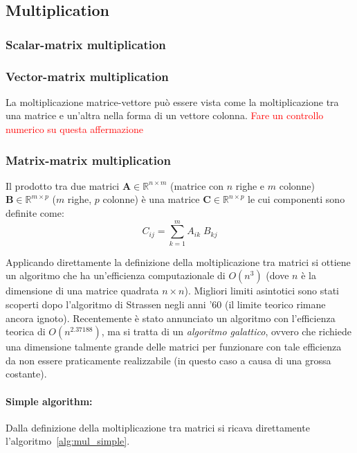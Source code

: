 \documentclass[10pt]{article}
\begin{document}
\subsection{Multiplication}

\subsubsection{Scalar-matrix multiplication}
\subsubsection{Vector-matrix multiplication}

La moltiplicazione matrice-vettore può essere vista come la moltiplicazione tra una matrice e un'altra nella forma di un vettore colonna.
\textcolor{red}{Fare un controllo numerico su questa affermazione}

\subsubsection{Matrix-matrix multiplication}

Il prodotto tra due matrici $\mathbf{A} \in \mathbb{R}^{n\times m}$ (matrice con $n$ righe e $m$ colonne) $\mathbf{B} \in \mathbb{R}^{m\times p}$ ($m$ righe, $p$ colonne) è una matrice $\mathbf{C} \in \mathbb{R}^{n\times p}$ le cui componenti sono definite come:
\begin{equation}
C_{ij} = \sum_{k=1}^m A_{ik} \; B_{kj}
\end{equation}

Applicando direttamente la definizione della moltiplicazione tra matrici si ottiene un algoritmo che ha un'efficienza computazionale di $O(n^3)$ (dove $n$ è la dimensione di una matrice quadrata $n\times n$). Migliori limiti asintotici sono stati scoperti dopo l'algoritmo di Strassen negli anni '60 (il limite teorico rimane ancora ignoto). Recentemente è stato annunciato un algoritmo con l'efficienza teorica di $O(n^{2.37188})$, ma si tratta di un \emph{algoritmo galattico}, ovvero che richiede una dimensione talmente grande delle matrici per funzionare con tale efficienza da non essere praticamente realizzabile (in questo caso a causa di una grossa costante).

\paragraph{Simple algorithm:} Dalla definizione della moltiplicazione tra matrici si ricava direttamente l'algoritmo~\ref{alg:mul_simple}.
\end{document}
